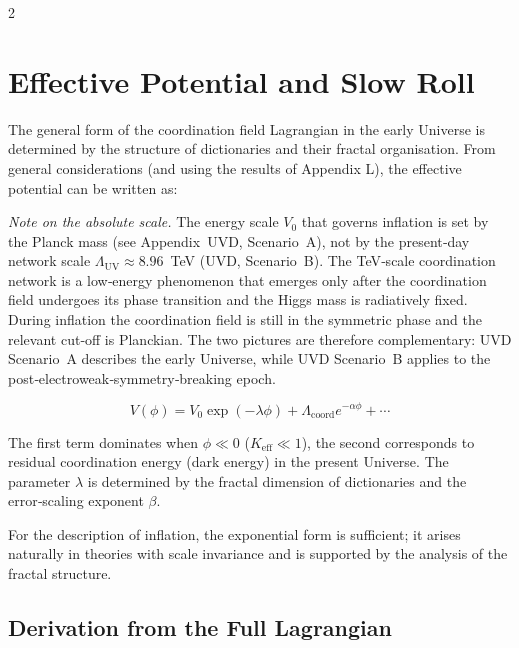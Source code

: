 \documentclass[12pt,a4paper]{article}
\newcommand{\Keff}{K_{\mathrm{eff}}}
\begin{document}
\begin{multicols}{2}
		\section{Effective Potential and Slow Roll}
		\label{sec:potential}
		
		The general form of the coordination field Lagrangian in the early Universe is determined by the structure of dictionaries and their fractal organisation. From general considerations (and using the results of Appendix L), the effective potential can be written as:
		
		\noindent\textit{Note on the absolute scale.}
		The energy scale \(V_0\) that governs inflation is set by the Planck mass
		(see Appendix~UVD, Scenario~A), not by the present‑day network scale
		\(\Lambda_{\mathrm{UV}} \approx 8.96\)~TeV (UVD, Scenario~B).  The
		TeV‑scale coordination network is a low‑energy phenomenon that emerges
		only after the coordination field undergoes its phase transition and the
		Higgs mass is radiatively fixed.  During inflation the coordination
		field is still in the symmetric phase and the relevant cut‑off is
		Planckian.  The two pictures are therefore complementary: UVD Scenario~A
		describes the early Universe, while UVD Scenario~B applies to the
		post‑electroweak‑symmetry‑breaking epoch.
		
		\begin{equation}
			V(\phi) = V_0 \exp\left( -\lambda \phi \right) + \Lambda_{\mathrm{coord}} e^{-\alpha \phi} + \cdots
			\label{eq:potential}
		\end{equation}
		
		The first term dominates when \(\phi \ll 0\) (\(\Keff \ll 1\)), the second corresponds to residual coordination energy (dark energy) in the present Universe. The parameter \(\lambda\) is determined by the fractal dimension of dictionaries and the error‑scaling exponent \(\beta\).
		
		For the description of inflation, the exponential form is sufficient; it arises naturally in theories with scale invariance and is supported by the analysis of the fractal structure.
		
		\subsection{Derivation from the Full Lagrangian}
		

\end{multicols}
\end{document}
